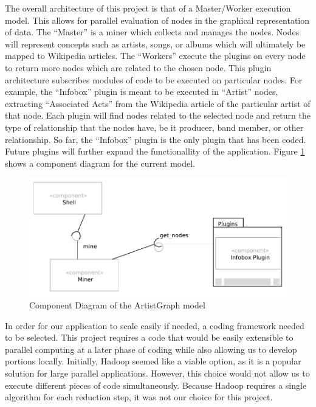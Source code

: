 \documentclass{sig-alternate}
\begin{document}
The overall architecture of this project is that of a Master/Worker execution model\cite{Garg:2001:TOA:558986}.
This allows for parallel evaluation of nodes in the graphical representation of data. 
The ``Master'' is a miner which collects and manages the nodes. Nodes will represent 
concepts such as artists, songs, or albums which will ultimately be mapped to Wikipedia 
articles. The ``Workers'' execute the plugins on every node to return more nodes which are 
related to the chosen node. This plugin architecture subscribes modules of code to be 
executed on particular nodes. For example, the ``Infobox'' plugin is meant to be executed 
in ``Artist'' nodes, extracting ``Associated Acts'' from the Wikipedia article of the particular 
artist of that node. Each plugin will find nodes related to the selected node and return 
the type of relationship that the nodes have, be it producer, band member, or other relationship. 
So far, the ``Infobox'' plugin is the only plugin that has been coded. 
Future plugins will further expand the functionallity of the application. Figure \ref{componentdiagram}
shows a component diagram for the current model.

\begin{figure}[ht!]
\centering
\includegraphics[width=12cm]{ArtistGraph_Architecture.PDF}
\caption{Component Diagram of the ArtistGraph model}
\label{componentdiagram}
\end{figure}

In order for our application to scale easily if needed, a coding framework needed to be selected. This project 
requires a code that would be easily extensible to parallel computing at a later phase of 
coding while also allowing us to develop portions locally. Initially, Hadoop seemed like 
a viable option, as it is a popular solution for large parallel applications. However, 
this choice would not allow us to execute different pieces of code simultaneously. Because 
Hadoop requires a single algorithm for each reduction step, it was not our choice for this project. 
\end{document}
